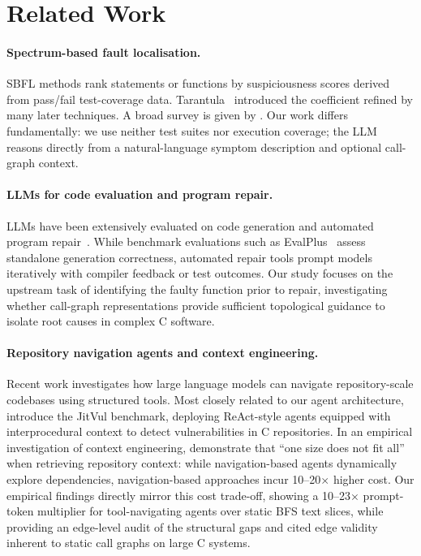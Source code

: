 \section{Related Work}
\label{sec:related}

\paragraph{Spectrum-based fault localisation.}
SBFL methods rank statements or functions by suspiciousness scores derived from
pass/fail test-coverage data.
Tarantula~\cite{jones05tarantula} introduced the coefficient refined by many
later techniques.
A broad survey is given by \citet{wong16survey}.
Our work differs fundamentally: we use neither test suites nor execution coverage;
the LLM reasons directly from a natural-language symptom description and optional
call-graph context.

\paragraph{LLMs for code evaluation and program repair.}
LLMs have been extensively evaluated on code generation and automated program
repair~\cite{sobania23chatgpt,liu23evalplus}.
While benchmark evaluations such as EvalPlus~\cite{liu23evalplus} assess standalone
generation correctness, automated repair tools prompt models iteratively with compiler
feedback or test outcomes.
Our study focuses on the upstream task of identifying the faulty function
prior to repair, investigating whether call-graph representations provide
sufficient topological guidance to isolate root causes in complex C software.

\paragraph{Repository navigation agents and context engineering.}
Recent work investigates how large language models can navigate repository-scale
codebases using structured tools.
Most closely related to our agent architecture, \citet{yildiz25jitvul} introduce
the JitVul benchmark, deploying ReAct-style agents equipped with interprocedural
context to detect vulnerabilities in C repositories.
In an empirical investigation of context engineering, \citet{li26onesize}
demonstrate that ``one size does not fit all'' when retrieving repository context:
while navigation-based agents dynamically explore dependencies, navigation-based
approaches incur 10--20$\times$ higher cost.
Our empirical findings directly mirror this cost trade-off, showing a 10--23$\times$
prompt-token multiplier for tool-navigating agents over static BFS text slices, while
providing an edge-level audit of the structural gaps and cited edge validity
inherent to static call graphs on large C systems.

